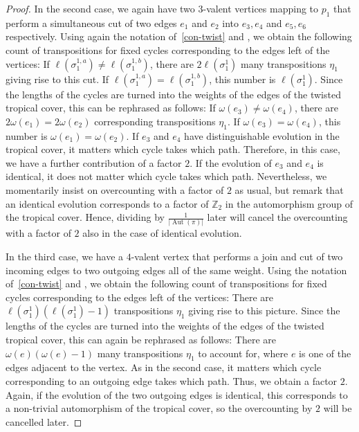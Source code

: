 \documentclass[ALCO,published]{cedram}
\DeclareMathOperator{\Aut}{Aut}
\begin{document}
\begin{proof}
In the second case, we again have two $3$-valent vertices mapping to $p_1$ that perform a simultaneous cut of two edges $e_1$ and $e_2$ into $e_3,e_4$ and $e_5,e_6$ respectively.  Using again the notation of~\cref{con-twist} and \cite[Theorem 2.12]{BF21}, we obtain the following count of transpositions for fixed cycles corresponding to the edges left of the vertices: If $\ell(\sigma_1^{1,a})\neq\ell(\sigma_1^{1,b})$, there are $2\ell(\sigma_1^1)$ many transpositions $\eta_1$ giving rise to this cut. If $\ell(\sigma_1^{1,a})=\ell(\sigma_1^{1,b})$, this number is $\ell(\sigma_1^1)$.
    Since the lengths of the cycles are turned into the weights of the edges of the twisted tropical cover, this can be rephrased as follows:    If $\omega(e_3)\neq\omega(e_4)$, there are $2\omega(e_1)=2\omega(e_2)$ corresponding transpositions $\eta_1$. If $\omega(e_3)=\omega(e_4)$, this number is $\omega(e_1)=\omega(e_2)$. If $e_3$ and $e_4$ have distinguishable evolution in the tropical cover, it matters which cycle takes which path. Therefore, in this case, we have a further contribution of a factor $2$. If the evolution of $e_3$ and $e_4$ is identical, it does not matter which cycle takes which path. Nevertheless, we momentarily insist on overcounting with a factor of $2$ as usual, but remark that an identical evolution     corresponds to a factor of $\mathbb{Z}_2$ in the automorphism group of the tropical cover. Hence, dividing by $\frac{1}{|\Aut(\pi)|}$ later will cancel the overcounting with a factor of $2$ also in the case of identical evolution.
    
In the third case, we have a $4$-valent vertex that performs a join and cut of two incoming edges to two outgoing edges all of the same weight. Using the notation of~\cref{con-twist} and \cite[Theorem 2.12]{BF21}, we obtain the following count of transpositions for fixed cycles corresponding to the edges left of the vertices:
There are $\ell(\sigma_1^1)(\ell(\sigma_1^1)-1)$ transpositions $\eta_1$ giving rise to this picture. Since the lengths of the cycles are turned into the weights of the edges of the twisted tropical cover, this can again be rephrased as follows:
There are $\omega(e)(\omega(e)-1)$ many transpositions $\eta_1$ to account for, where $e$ is one of the edges adjacent to the vertex. As in the second case, it matters which cycle corresponding to an outgoing edge takes which path. Thus, we obtain a factor $2$. Again, if the evolution of the two outgoing edges is identical, this corresponds to a non-trivial automorphism of the tropical cover, so the overcounting by $2$ will be cancelled later.


\end{proof}
\end{document}
